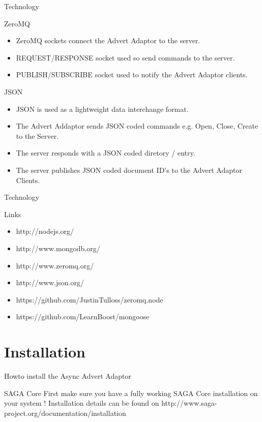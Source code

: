 \documentclass{beamer}
\begin{document}
    \begin{frame}{Technology}
      \begin{block}{ZeroMQ}
        \begin{itemize}
          \item ZeroMQ sockets connect the Advert Adaptor to the server.
          \item REQUEST/RESPONSE socket used so send commands to the server.
          \item PUBLISH/SUBSCRIBE socket used to notify the Advert Adaptor clients.
        \end{itemize}
      \end{block}
      
      \begin{block}{JSON}
        \begin{itemize}
          \item JSON is used as a lightweight data interchange format.
          \item The Advert Addaptor sends JSON coded commands e.g. Open, Close, Create to the Server.
          \item The server responds with a JSON coded diretory / entry. 
          \item The server publishes JSON coded document ID's to the Advert Adaptor Clients. 
        \end{itemize}
      \end{block}
    \end{frame}
    
    \begin{frame}{Technology}
      \begin{block}{Links}
        \begin{itemize}
          \item http://nodejs.org/
          \item http://www.mongodb.org/
          \item http://www.zeromq.org/
          \item http://www.json.org/
          \item https://github.com/JustinTulloss/zeromq.node
          \item https://github.com/LearnBoost/mongoose
          
        \end{itemize}
      \end{block}
    \end{frame}
    
  \section{Installation}
    \begin{frame}{Howto install the Async Advert Adaptor}
       \begin{alertblock}{SAGA Core}
         First make sure you have a fully working SAGA Core installation on your system ! 
         Installation details can be found on http://www.saga-project.org/documentation/installation
       \end{alertblock}
    \end{frame}
    
\end{document}
